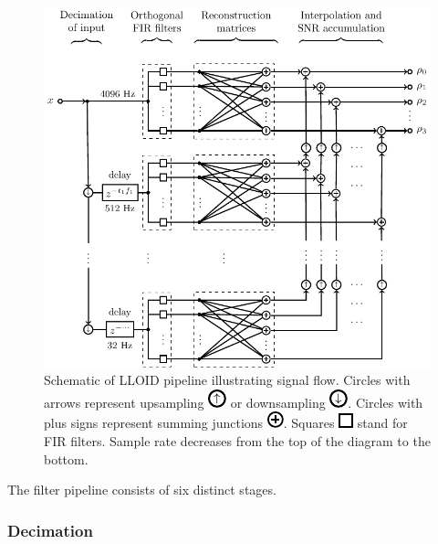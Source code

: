 \begin{figure}[htbp]
	\includegraphics{figures/lloid-diagram.pdf}
	\caption{Schematic of LLOID pipeline illustrating signal flow.  Circles with arrows represent upsampling \protect\includegraphics{figures/upsample-symbol.pdf} or downsampling \protect\includegraphics{figures/downsample-symbol.pdf}.  Circles with plus signs represent summing junctions \protect\includegraphics{figures/adder-symbol.pdf}.  Squares \protect\includegraphics{figures/fir-symbol.pdf} stand for FIR filters.  Sample rate decreases from the top of the diagram to the bottom.}
\end{figure}

The filter pipeline consists of six distinct stages.

\subsubsection{Decimation}

